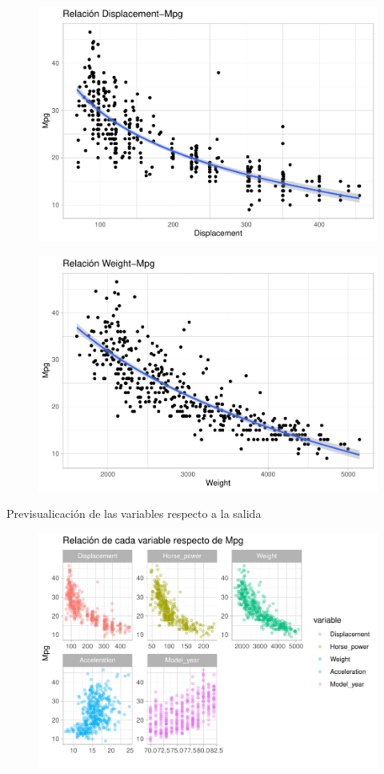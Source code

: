 \begin{figure}[H]\includegraphics[width=.9\linewidth]{img/EDA_files/figure-latex/unnamed-chunk-22-1} \caption{}\end{figure}
\begin{figure}[H]\includegraphics[width=.9\linewidth]{img/EDA_files/figure-latex/unnamed-chunk-22-2} \caption{}\end{figure}

Previsualicación de las variables respecto a la salida

\begin{figure}[H]\includegraphics[width=.9\linewidth]{img/EDA_files/figure-latex/unnamed-chunk-23-1} \caption{}\end{figure}

